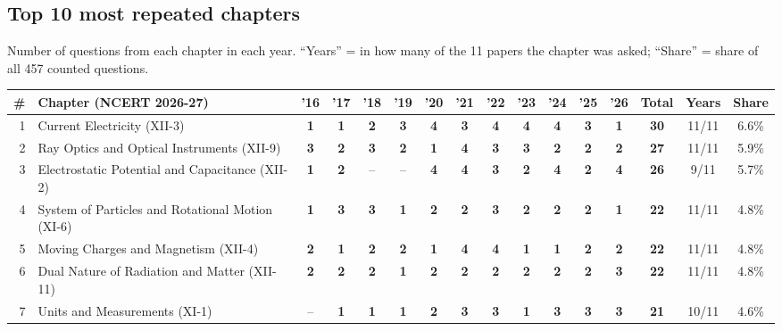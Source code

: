 \documentclass[10pt,a4paper]{article}
\begin{document}
\subsection*{Top 10 most repeated chapters}
{\small Number of questions from each chapter in each year. ``Years'' = in how many of the 11 papers the chapter was asked; ``Share'' = share of all 457 counted questions.}\par\smallskip
{\footnotesize\setlength{\tabcolsep}{2.6pt}\renewcommand{\arraystretch}{1.25}
\begin{tabularx}{\linewidth}{@{}r>{\raggedright\arraybackslash}X*{11}{c}ccc@{}}\toprule
\# & Chapter (NCERT 2026-27) & '16 & '17 & '18 & '19 & '20 & '21 & '22 & '23 & '24 & '25 & '26 & Total & Years & Share\\\midrule
1 & Current Electricity {\scriptsize(XII-3)} & \textbf{1} & \textbf{1} & \textbf{2} & \textbf{3} & \textbf{4} & \textbf{3} & \textbf{4} & \textbf{4} & \textbf{4} & \textbf{3} & \textbf{1} & \textbf{30} & 11/11 & 6.6\%\\
2 & Ray Optics and Optical Instruments {\scriptsize(XII-9)} & \textbf{3} & \textbf{2} & \textbf{3} & \textbf{2} & \textbf{1} & \textbf{4} & \textbf{3} & \textbf{3} & \textbf{2} & \textbf{2} & \textbf{2} & \textbf{27} & 11/11 & 5.9\%\\
3 & Electrostatic Potential and Capacitance {\scriptsize(XII-2)} & \textbf{1} & \textbf{2} & {\color{gray!60}--} & {\color{gray!60}--} & \textbf{4} & \textbf{4} & \textbf{3} & \textbf{2} & \textbf{4} & \textbf{2} & \textbf{4} & \textbf{26} & 9/11 & 5.7\%\\
4 & System of Particles and Rotational Motion {\scriptsize(XI-6)} & \textbf{1} & \textbf{3} & \textbf{3} & \textbf{1} & \textbf{2} & \textbf{2} & \textbf{3} & \textbf{2} & \textbf{2} & \textbf{2} & \textbf{1} & \textbf{22} & 11/11 & 4.8\%\\
5 & Moving Charges and Magnetism {\scriptsize(XII-4)} & \textbf{2} & \textbf{1} & \textbf{2} & \textbf{2} & \textbf{1} & \textbf{4} & \textbf{4} & \textbf{1} & \textbf{1} & \textbf{2} & \textbf{2} & \textbf{22} & 11/11 & 4.8\%\\
6 & Dual Nature of Radiation and Matter {\scriptsize(XII-11)} & \textbf{2} & \textbf{2} & \textbf{2} & \textbf{1} & \textbf{2} & \textbf{2} & \textbf{2} & \textbf{2} & \textbf{2} & \textbf{2} & \textbf{3} & \textbf{22} & 11/11 & 4.8\%\\
7 & Units and Measurements {\scriptsize(XI-1)} & {\color{gray!60}--} & \textbf{1} & \textbf{1} & \textbf{1} & \textbf{2} & \textbf{3} & \textbf{3} & \textbf{1} & \textbf{3} & \textbf{3} & \textbf{3} & \textbf{21} & 10/11 & 4.6\%\\

\end{tabularx}}
\end{document}
